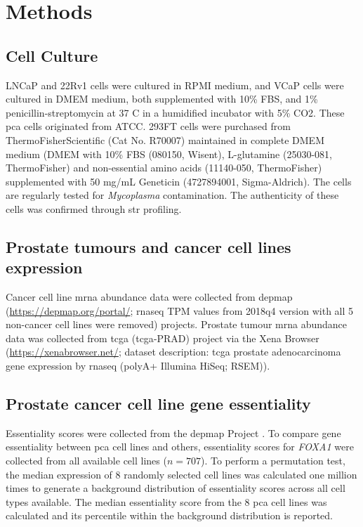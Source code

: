 \section{Methods}
\label{sec:FOXA1_methods}

\subsection{Cell Culture}

LNCaP and 22Rv1 cells were cultured in RPMI medium, and VCaP cells were cultured in DMEM medium, both supplemented with 10\% FBS, and 1\% penicillin-streptomycin at 37 \textdegree C in a humidified incubator with 5\% CO2.
These \gls{pca} cells originated from ATCC.
293FT cells were purchased from ThermoFisherScientific (Cat No. R70007) maintained in complete DMEM medium (DMEM with 10\% FBS (080150, Wisent), L-glutamine (25030-081, ThermoFisher) and non-essential amino acids (11140-050, ThermoFisher) supplemented with 50 mg/mL Geneticin (4727894001, Sigma-Aldrich).
The cells are regularly tested for \emph{Mycoplasma} contamination.
The authenticity of these cells was confirmed through \gls{str} profiling.

\subsection{Prostate tumours and cancer cell lines expression}

Cancer cell line \gls{mrna} abundance data were collected from \gls{depmap} (\url{https://depmap.org/portal/}; \gls{rnaseq} TPM values from 2018q4 version with all 5 non-cancer cell lines were removed) \cite{thecancercelllineencyclopediaconsortiumPharmacogenomicAgreementTwo2015} projects.
Prostate tumour \gls{mrna} abundance data was collected from \gls{tcga}  (\gls{tcga}-PRAD) project via the Xena Browser (\url{https://xenabrowser.net/}; dataset description: \gls{tcga} prostate adenocarcinoma gene expression by \gls{rnaseq} (polyA+ Illumina HiSeq; RSEM)).

\subsection{Prostate cancer cell line gene essentiality}

Essentiality scores were collected from the \gls{depmap} Project \cite{mcfarlandImprovedEstimationCancer2018}.
To compare gene essentiality between \gls{pca} cell lines and others, essentiality scores for \emph{FOXA1} were collected from all available cell lines ($n = 707$).
To perform a permutation test, the median expression of 8 randomly selected cell lines was calculated one million times to generate a background distribution of essentiality scores across all cell types available.
The median essentiality score from the 8 \gls{pca} cell lines was calculated and its percentile within the background distribution is reported.

